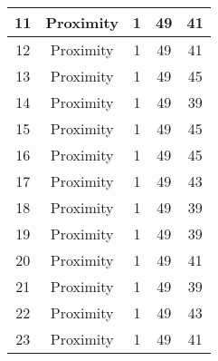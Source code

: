 \documentclass[results.tex]{subfiles}
\begin{document}
\begin{center}
\begin{tabular}{| c || c | c | c | c |}
            \hline
            11                      & Proximity                    & 1                      & 49                      & 41                   \\
            \hline
            12                      & Proximity                    & 1                      & 49                      & 41                   \\
            \hline
            13                      & Proximity                    & 1                      & 49                      & 45                   \\
            \hline
            14                      & Proximity                    & 1                      & 49                      & 39                   \\
            \hline
            15                      & Proximity                    & 1                      & 49                      & 45                   \\
            \hline
            16                      & Proximity                    & 1                      & 49                      & 45                   \\
            \hline
            17                      & Proximity                    & 1                      & 49                      & 43                   \\
            \hline
            18                      & Proximity                    & 1                      & 49                      & 39                   \\
            \hline
            19                      & Proximity                    & 1                      & 49                      & 39                   \\
            \hline
            20                      & Proximity                    & 1                      & 49                      & 41                   \\
            \hline
            21                      & Proximity                    & 1                      & 49                      & 39                   \\
            \hline
            22                      & Proximity                    & 1                      & 49                      & 43                   \\
            \hline
            23                      & Proximity                    & 1                      & 49                      & 41                   \\

\end{tabular}
\end{center}
\end{document}
